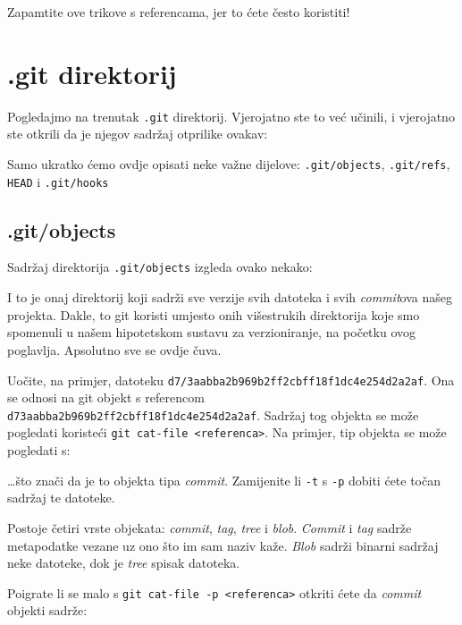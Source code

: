 Zapamtite ove trikove s referencama, jer to ćete često koristiti!

\section*{.git direktorij}

Pogledajmo na trenutak \verb+.git+ direktorij. 
Vjerojatno ste to već učinili, i vjerojatno ste otkrili da je njegov sadržaj otprilike ovakav:



Samo ukratko ćemo ovdje opisati neke važne dijelove: \verb+.git/objects+, \verb+.git/refs+, \verb+HEAD+ i \verb+.git/hooks+

\subsection*{.git/objects}

Sadržaj direktorija \verb+.git/objects+ izgleda ovako nekako:



I to je onaj direktorij koji sadrži sve verzije svih datoteka i svih \emph{commit}ova našeg projekta.
Dakle, to git koristi umjesto onih višestrukih direktorija koje smo spomenuli u našem hipotetskom sustavu za verzioniranje, na početku ovog poglavlja.
Apsolutno sve se ovdje čuva.

Uočite, na primjer, datoteku \verb+d7/3aabba2b969b2ff2cbff18f1dc4e254d2a2af+.
Ona se odnosi na git objekt s referencom \verb+d73aabba2b969b2ff2cbff18f1dc4e254d2a2af+.
Sadržaj tog objekta se može pogledati koristeći \verb+git cat-file <referenca>+.
Na primjer, tip objekta se može pogledati s:



\dots{}što znači da je to objekta tipa \emph{commit}.
Zamijenite li \verb+-t+ s \verb+-p+ dobiti ćete točan sadržaj te datoteke.

Postoje četiri vrste objekata: \emph{commit}, \emph{tag}, \emph{tree} i \emph{blob}. 
\emph{Commit} i \emph{tag} sadrže metapodatke vezane uz ono što im sam naziv kaže.
\emph{Blob} sadrži binarni sadržaj neke datoteke, dok je \emph{tree} spisak datoteka.

Poigrate li se malo s \verb+git cat-file -p <referenca>+ otkriti ćete da \emph{commit} objekti sadrže:


